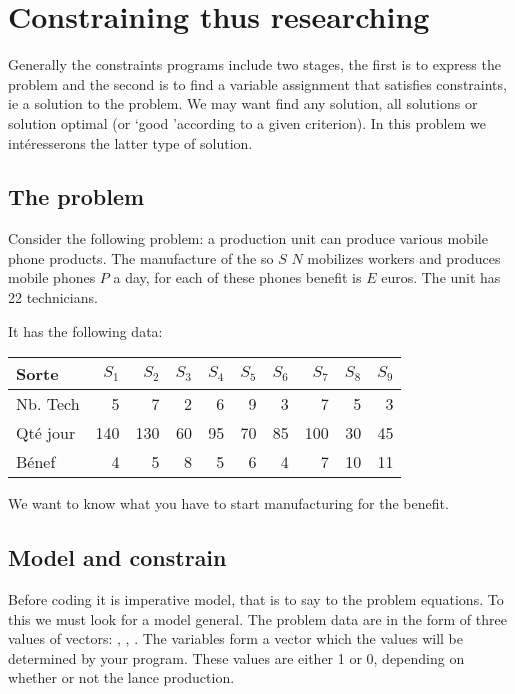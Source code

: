 \chapter{Constraining thus researching}

\noindent Generally the constraints programs include
two stages, the first is to express the problem and the second
is to find a variable assignment that satisfies
constraints, ie a solution to the problem. We may want
find any solution, all solutions or solution
optimal (or `good 'according to a given criterion). In this problem we
intéresserons the latter type of solution.

\section{The problem}
\label{sec:immoral}

Consider the following problem: a production unit can produce
various mobile phone products. The manufacture of the so $ S $
$ N $ mobilizes workers and produces mobile phones $ P $ a day,
for each of these phones benefit is $ E $ euros. The unit has
22 technicians.

It has the following data:

\begin{center}
    \begin{tabular}{|l|r|r|r|r|r|r|r|r|r|}
        \hline
        Sorte & $S_1$ & $S_2$ & $S_3$ & $S_4$ &
                $S_5$ & $S_6$ & $S_7$ & $S_8$ & $S_9$\\ \hline
        Nb. Tech &5&7&2&6&9&3&7&5&3\\ \hline
        Qté jour&140&130&60&95&70&85&100&30&45\\ \hline
        Bénef&4&5&8&5&6&4&7&10&11\\ \hline
    \end{tabular}
\end{center}



We want to know what you have to start manufacturing for the benefit.

\newpage
\section{Model and constrain}

Before coding it is imperative model, that is to say to
the problem equations. To this we must look for a model
general. The problem data are in the form of three
values of vectors: , ,
. The variables form a vector  which
the values will be determined by your program. These values are
either 1 or 0, depending on whether or not the lance production.

